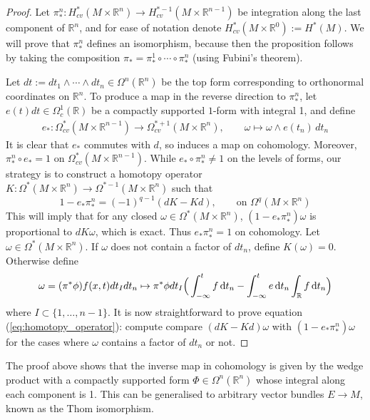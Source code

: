 \begin{proof} %
	Let $\pi^n_* : H_{cv}^*(M\times \mathbb{R}^n) \to H_{cv}^{*-1}(M\times
	\mathbb{R}^{n-1})$ be integration along the last component of
	$\mathbb{R}^n$, and for ease of notation denote $H_{cv}^*(M\times
	\mathbb{R}^0) := H^*(M)$. We will prove that $\pi^n_*$ defines an
	isomorphism, because then the proposition follows by taking the composition
	$\pi_* = \pi^1_* \circ \cdots\circ \pi^n_*$ (using Fubini's theorem).

	Let $dt:=dt_1\wedge \cdots\wedge dt_n\in\Omega^n(\mathbb{R}^n)$ be the top 
	form corresponding to orthonormal coordinates on $\mathbb{R}^n$. 
	To produce a map in the reverse direction to $\pi^n_*$, let $e(t)dt \in
	\Omega^1_c(\mathbb{R})$ be a compactly supported $1$-form with integral 1,
	and define 
	\begin{align*}
	e_* : \Omega_{cv}^*(M\times \mathbb{R}^{n-1}) \to 
	\Omega^{*+1}_{cv}(M\times \mathbb{R}^n), \qquad  
	\omega \mapsto \omega \wedge e(t_n)\, dt_n 
	\end{align*}
	It is clear that $e_*$ commutes with  $d$, so induces a map on cohomology.
	Moreover,  $\pi_*^n \circ e_* = 1$ on  $\Omega_{cv}^*(M\times
	\mathbb{R}^{n-1})$. While $e_*\circ
	\pi_*^n \neq 1$ on the levels of forms, our strategy is to construct a
	homotopy operator  $K:\Omega^{*}(M\times \mathbb{R}^n) \to
	\Omega^{*-1}(M\times \mathbb{R}^n)$ such that 
	\begin{equation} \label{eq:homotopy_operator}
		1-e_*\pi_*^n = (-1)^{q-1}(dK-Kd), \qquad 
		\text{on } \Omega^q(M\times \mathbb{R}^n)
	\end{equation}
	This will imply that for any closed $\omega \in \Omega^*(M\times
	\mathbb{R}^n)$, $(1-e_*\pi_*^n)\omega$ is proportional to  $dK\omega$, 
	which is exact. Thus $e_*\pi_*^n=1$ on cohomology.
	Let $\omega \in \Omega^*(M\times \mathbb{R}^n)$. If $\omega$ does not 
	contain a factor of  $dt_n$, define $K(\omega) = 0$. Otherwise define 
	\[
		\omega = (\pi^*\phi) f(x,t) dt_I dt_n \mapsto 
		\pi^*\phi dt_I\paren[2]{\int_{-\infty}^t f \odif{t_n} 
		- \int_{-\infty}^t e \odif{t_n} \int_{\mathbb{R}} f \odif{t_n}}
	\] 
	where $I \subset \{1,\ldots,n-1\}$.
	It is now straightforward to prove equation (\ref{eq:homotopy_operator}):
	compute compare $(dK-Kd)\omega$ with $(1-e_*\pi_*^n)\omega$ for the cases 
	where $\omega$ contains a factor of $dt_n$ or not.
\end{proof}
The proof above shows that the inverse map in cohomology is given by the wedge
product with a compactly supported form $\Phi \in \Omega^{n}(\mathbb{R}^n)$ 
whose integral along each component is 1. This can be generalised to arbitrary 
vector bundles $E\to M$, known as the Thom isomorphism. 


